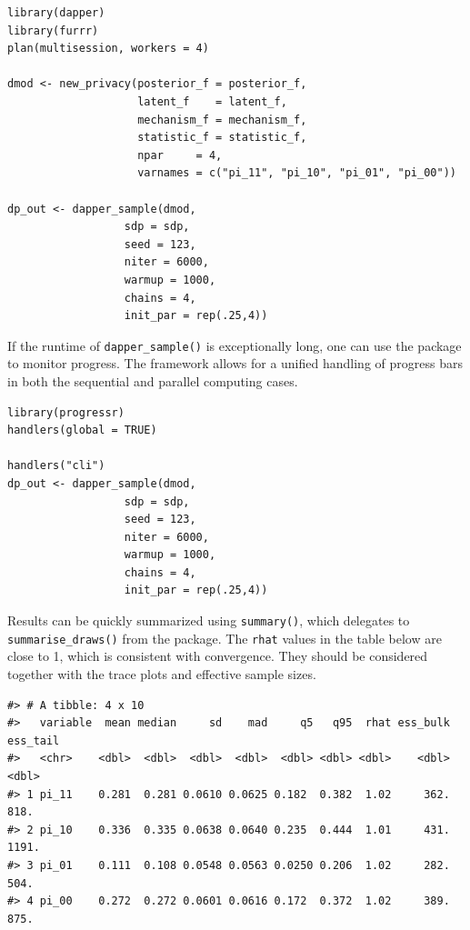 \begin{verbatim}
library(dapper)
library(furrr)
plan(multisession, workers = 4)

dmod <- new_privacy(posterior_f = posterior_f,
                    latent_f    = latent_f,
                    mechanism_f = mechanism_f,
                    statistic_f = statistic_f,
                    npar     = 4,
                    varnames = c("pi_11", "pi_10", "pi_01", "pi_00"))
                  
dp_out <- dapper_sample(dmod,
                  sdp = sdp,
                  seed = 123,
                  niter = 6000,
                  warmup = 1000,
                  chains = 4,
                  init_par = rep(.25,4))
\end{verbatim}

If the runtime of \texttt{dapper\_sample()} is exceptionally long, one can
use the  package to monitor progress. The  framework
allows for a unified handling of progress bars in both the sequential and
parallel computing cases.

\begin{verbatim}
library(progressr)
handlers(global = TRUE)

handlers("cli")
dp_out <- dapper_sample(dmod,
                  sdp = sdp,
                  seed = 123,
                  niter = 6000,
                  warmup = 1000,
                  chains = 4,
                  init_par = rep(.25,4))
\end{verbatim}

Results can be quickly summarized using \texttt{summary()}, which delegates to
\texttt{summarise\_draws()} from the  package. The \texttt{rhat} values in the table below are close
to 1, which is consistent with convergence. They should be considered together
with the trace plots and effective sample sizes.

\begin{verbatim}
#> # A tibble: 4 x 10
#>   variable  mean median     sd    mad     q5   q95  rhat ess_bulk ess_tail
#>   <chr>    <dbl>  <dbl>  <dbl>  <dbl>  <dbl> <dbl> <dbl>    <dbl>    <dbl>
#> 1 pi_11    0.281  0.281 0.0610 0.0625 0.182  0.382  1.02     362.     818.
#> 2 pi_10    0.336  0.335 0.0638 0.0640 0.235  0.444  1.01     431.    1191.
#> 3 pi_01    0.111  0.108 0.0548 0.0563 0.0250 0.206  1.02     282.     504.
#> 4 pi_00    0.272  0.272 0.0601 0.0616 0.172  0.372  1.02     389.     875.
\end{verbatim}

